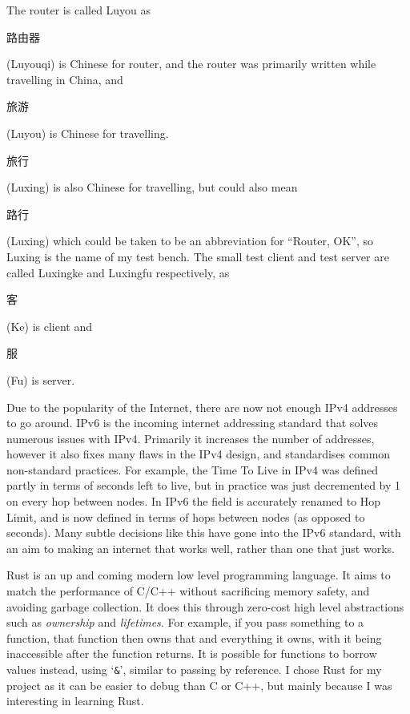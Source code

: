 \documentclass[12pt,a4paper,twoside,openright]{report}
\begin{document}
The router is called Luyou as \begin{CJK}{UTF8}{gbsn}路由器\end{CJK} (Luyouqi) is Chinese for router, and the router was primarily written while travelling in China, and \begin{CJK}{UTF8}{gbsn}旅游\end{CJK} (Luyou) is Chinese for travelling. \begin{CJK}{UTF8}{gbsn}旅行\end{CJK} (Luxing) is also Chinese for travelling, but could also mean \begin{CJK}{UTF8}{gbsn}路行\end{CJK} (Luxing) which could be taken to be an abbreviation for ``Router, OK'', so Luxing is the name of my test bench. The small test client and test server are called Luxingke and Luxingfu respectively, as \begin{CJK}{UTF8}{gbsn}客\end{CJK} (Ke) is client and \begin{CJK}{UTF8}{gbsn}服\end{CJK} (Fu) is server.

\bigskip

Due to the popularity of the Internet, there are now not enough IPv4 addresses to go around. IPv6 is the incoming internet addressing standard that solves numerous issues with IPv4.  Primarily it increases the number of addresses, however it also fixes many flaws in the IPv4 design, and standardises common non-standard practices. For example, the Time To Live in IPv4 was defined partly in terms of seconds left to live\cite{ipv4_rfc}, but in practice was just decremented by 1 on every hop between nodes. In IPv6 the field is accurately renamed to Hop Limit, and is now defined in terms of hops between nodes (as opposed to seconds). Many subtle decisions like this have gone into the IPv6 standard, with an aim to making an internet that works well, rather than one that just works.

\bigskip

Rust\cite{rust} is an up and coming modern low level programming language. It aims to match the performance of C/C++ without sacrificing memory safety, and avoiding garbage collection. It does this through zero-cost high level abstractions such as \textit{ownership} and \textit{lifetimes}. For example, if you pass something to a function, that function then owns that and everything it owns, with it being inaccessible after the function returns. It is possible for functions to borrow values instead, using `\verb!&!', similar to passing by reference.  I chose Rust for my project as it can be easier to debug than C or C++, but mainly because I was interesting in learning Rust.
\end{document}
